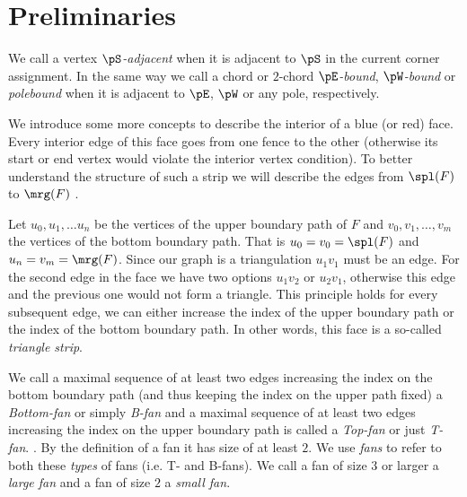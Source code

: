 
\section{Preliminaries}
\thispagestyle{plain}

  We call a vertex \emph{$\pS$-adjacent} when it is adjacent to $\pS$ in the current corner assignment. In the same way we call a chord or $2$-chord \emph{$\pE$-bound}, \emph{$\pW$-bound} or \emph{polebound} when it is adjacent to $\pE$, $\pW$ or any pole,  respectively.

  We introduce some more concepts to describe the interior of a blue (or red) face. Every interior edge of this face goes from one fence to the other (otherwise its start or end vertex would violate the interior vertex condition). To better understand the structure of such a strip we will describe the edges from $\spl(F)$ to $\mrg(F)$ .

  Let $u_0 , u_1, \ldots u_n$ be the vertices of the upper boundary path of $F$ and $v_0, v_1, \ldots, v_m$ the vertices of the bottom boundary path. That is $u_0=v_0 = \spl(F)$ and $u_n = v_m = \mrg(F)$. Since our graph is a triangulation $u_1v_1$ must be an edge. For the second edge in the face we have two options $u_1v_2$ or $u_2v_1$, otherwise this edge and the previous one would not form a triangle. This principle holds for every subsequent edge, we can either increase the index of the upper boundary path or the index of the bottom boundary path. In other words, this face is a so-called \emph{triangle strip}.

  We call a maximal sequence of at least two edges increasing the index on the bottom boundary path (and thus keeping the index on the upper path fixed) a \emph{Bottom-fan} or simply \emph{B-fan} and a maximal sequence of at least two edges increasing the index on the upper boundary path is called a \emph{Top-fan} or just \emph{T-fan}. . By the definition of a fan it has size of at least $2$.
  We use \emph{fans} to refer to both these \emph{types} of fans (i.e. T- and B-fans).
  We call a fan of size $3$ or larger a \emph{large fan} and a fan of size $2$ a \emph{small fan}.

